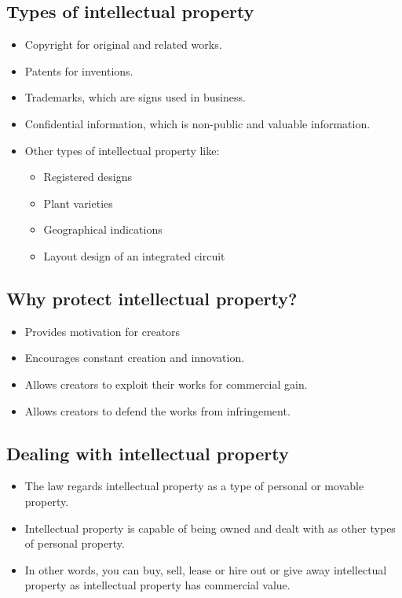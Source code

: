 \documentclass[11pt]{article}
\begin{document}
\subsection{Types of intellectual property}
\label{sec:orgf18c9d6}
\begin{itemize}
\item Copyright for original and related works.
\item Patents for inventions.
\item Trademarks, which are signs used in business.
\item Confidential information, which is non-public and valuable information.
\item Other types of intellectual property like:
\begin{itemize}
\item Registered designs
\item Plant varieties
\item Geographical indications
\item Layout design of an integrated circuit
\end{itemize}
\end{itemize}
\subsection{Why protect intellectual property?}
\label{sec:orgbab1d86}
\begin{itemize}
\item Provides motivation for creators
\item Encourages constant creation and innovation.
\item Allows creators to exploit their works for commercial gain.
\item Allows creators to defend the works from infringement.
\end{itemize}
\subsection{Dealing with intellectual property}
\label{sec:org904021e}
\begin{itemize}
\item The law regards intellectual property as a type of personal or movable property.
\item Intellectual property is capable of being owned and dealt with as other types of personal property.
\item In other words, you can buy, sell, lease or hire out or give away intellectual property as intellectual property has commercial value.
\end{itemize}
\end{document}
